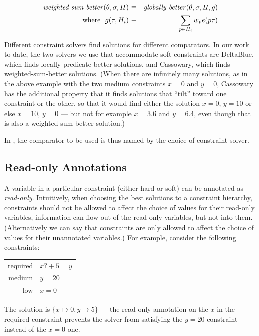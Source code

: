 \begin{eqnarray*}
\mbox{\em weighted-sum-better\/}(\theta,\sigma,H)  & \equiv &
  \mbox{\em globally-better\/}(\theta,\sigma,H,g)  \\
  \mbox{\rm where\ \ } g(\tau,H_i) & \equiv & 
	\sum_{p \in H_i} w_p e(p \tau) \\
\end{eqnarray*}

Different constraint solvers find solutions for different comparators.
In our work to date, the two solvers we use that accommodate soft
constraints are DeltaBlue, which finds locally-predicate-better
solutions, and Cassowary, which finds weighted-sum-better solutions.
(When there are infinitely many solutions, as in the above example
with the two medium constraints $x=0$ and $y=0$, Cassowary has the
additional property that it finds solutions that ``tilt'' toward one
constraint or the other, so that it would find either the solution
$x=0$, $y=10$ or else $x=10$, $y=0$ --- but not for example $x=3.6$
and $y=6.4$, even though that is also a weighted-sum-better solution.)

In \langname, the comparator to be used is thus named by the choice of
constraint solver.

\subsection{Read-only Annotations}

A variable in a particular constraint (either hard or soft) can be
annotated as \emph{read-only}.  Intuitively, when choosing the best
solutions to a constraint hierarchy, constraints should not be allowed
to affect the choice of values for their read-only variables, \ie
information can flow out of the read-only variables, but not into
them.  (Alternatively we can say that constraints are only allowed to
affect the choice of values for their unannotated variables.)  For
example, consider the following constraints:
\begin{center}
\begin{tabular}{rl}
required &     $x?+5=y$ \\
medium   &     $y=20$ \\
low      &     $x=0$
\end{tabular}
\end{center}

The solution is $\{x \mapsto 0, y \mapsto 5\}$ --- the read-only
annotation on the $x$ in the required constraint prevents the solver
from satisfying the $y=20$ constraint instead of the $x=0$ one.

